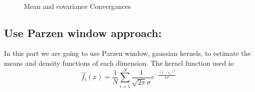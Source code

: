\documentclass[11pt, oneside]{article}   	%
\begin{document}
\begin{figure}
\begin{center}
	\\
\end{center}
\caption{Mean and covariance Convergances}
\end{figure}

\subsection{Use Parzen window approach:}
In this part we are going to use Parzen window, gaussian kernels, to estimate the means and density functions of each dimension. The kernel function used is:
$$\hat{f_i}(x)=\frac{1}{N}\sum_{i=1}^{N}\frac{1}{\sqrt{2\pi}\sigma} e^{-\frac{(x-x_i)^2}{2\sigma^2}} $$
\end{document}
